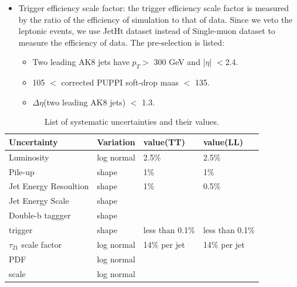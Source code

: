 \begin{itemize}
	\item Trigger efficiency scale factor: the trigger efficiency scale factor is measured by the ratio of the efficiency of simulation to that of data. Since we veto the leptonic events, we use JetHt dataset instead of Single-muon dataset to measure the efficiency of data. The pre-selection is listed:
   \begin{itemize}
	\item Two leading AK8 jets have $p_{T} >$ 300 GeV and |$\eta$| $<$2.4.
	\item 105 $<$ corrected PUPPI soft-drop maas $<$ 135.
	\item $\Delta \eta$(two leading AK8 jets) $<$ 1.3.
	\end{itemize}
\end{itemize}

\clearpage
\begin{table}[h!]
  \begin{center}
    \begin{tabular}{l|l|l|l}
    Uncertainty & Variation & value(TT) & value(LL) \\
    \hline
    Luminosity & log normal & 2.5$\% $ & 2.5$\% $\\
    Pile-up & shape & 1$\% $ & 1$\% $\\
    Jet Energy Resoultion & shape & 1$\% $ & 0.5$\% $\\
    Jet Energy Scale & shape & \\
    Double-b taggger & shape & \\
    trigger & shape & less than 0.1$\% $ & less than 0.1$\% $\\
    $\tau _{21}$ scale factor & log normal & 14$\% $ per jet & 14$\% $ per jet\\
    PDF & log normal & \\
    scale & log normal & \\
    \hline
    \end{tabular}
  \end{center}

  \caption{List of systematic uncertainties and their values.}
\end{table} 